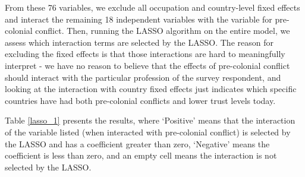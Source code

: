 From these 76 variables, we exclude all occupation and country-level fixed effects and interact the remaining 18 independent variables with the variable for pre-colonial conflict.  Then, running the LASSO algorithm on the entire model, we assess which interaction terms are selected by the LASSO. The reason for excluding the fixed effects is that those interactions are hard to meaningfully interpret - we have no reason to believe that the effects of pre-colonial conflict should interact with the particular profession of the survey respondent, and looking at the interaction with country fixed effects just indicates which specific countries have had both pre-colonial conflicts and lower trust levels today. 

Table \ref{lasso_1} presents the results, where `Positive' means that the interaction of the variable listed (when interacted with pre-colonial conflict) is selected by the LASSO and has a coefficient greater than zero, `Negative' means the coefficient is less than zero, and an empty cell means the interaction is not selected by the LASSO. 

